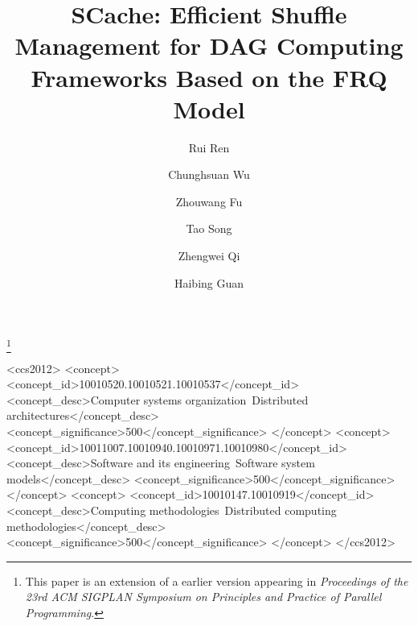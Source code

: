 \documentclass[format=acmsmall, review=false, screen=true]{acmart}
\begin{document}
\title[Efficient Shuffle Management for DAG Computing Frameworks Based on the FRQ Model]
{SCache: Efficient Shuffle Management for DAG Computing Frameworks Based on the FRQ Model}

\author{Rui Ren}
\author{Chunghsuan Wu}
\author{Zhouwang Fu}
\author{Tao Song}
\author{Zhengwei Qi}
\author{Haibing Guan}
\thanks{
This paper is an extension of a earlier version appearing in  \textit{Proceedings of the 23rd ACM SIGPLAN Symposium on Principles and Practice of Parallel Programming}\cite{fu2018efficient}.
}




%
%
\begin{CCSXML}
  <ccs2012>
  <concept>
  <concept_id>10010520.10010521.10010537</concept_id>
  <concept_desc>Computer systems organization~Distributed architectures</concept_desc>
  <concept_significance>500</concept_significance>
  </concept>
  <concept>
  <concept_id>10011007.10010940.10010971.10010980</concept_id>
  <concept_desc>Software and its engineering~Software system models</concept_desc>
  <concept_significance>500</concept_significance>
  </concept>
  <concept>
  <concept_id>10010147.10010919</concept_id>
  <concept_desc>Computing methodologies~Distributed computing methodologies</concept_desc>
  <concept_significance>500</concept_significance>
  </concept>
  </ccs2012>
\end{CCSXML}


%
%






\maketitle

\renewcommand{\shortauthors}{R. Rui et al.}













\end{document}
